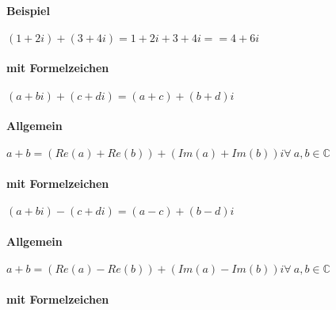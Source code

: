 \documentclass{../tudscript}
\begin{document}
\hypertarget{rechenoperation-mit-komplexen-zahlen}{%
\label{rechenoperation-mit-komplexen-zahlen}}

\hypertarget{addition}{%
\label{addition}}

\hypertarget{beispiel}{%
\paragraph{Beispiel}\label{beispiel}}

\((1+2i) + (3+4i) = 1 + 2i + 3+ 4i = = 4 + 6i\)

\hypertarget{mit-formelzeichen}{%
\paragraph{mit Formelzeichen}\label{mit-formelzeichen}}

\((a+bi) + (c+di) = (a+c) + (b+d)i\)

\hypertarget{allgemein}{%
\paragraph{Allgemein}\label{allgemein}}

\(a+b = (Re(a) + Re(b)) + (Im(a) + Im(b))i \forall \> a,b \in \mathbb{C}\)

\hypertarget{subtraktion}{%
\label{subtraktion}}

\hypertarget{mit-formelzeichen-1}{%
\paragraph{mit Formelzeichen}\label{mit-formelzeichen-1}}

\((a+bi) - (c+di) = (a-c) + (b-d)i\)

\hypertarget{allgemein-1}{%
\paragraph{Allgemein}\label{allgemein-1}}

\(a+b = (Re(a) - Re(b)) + (Im(a) - Im(b))i \forall \> a,b \in \mathbb{C}\)

\hypertarget{multiplikation}{%
\label{multiplikation}}

\hypertarget{mit-formelzeichen-2}{%
\paragraph{mit Formelzeichen}\label{mit-formelzeichen-2}}
\end{document}
